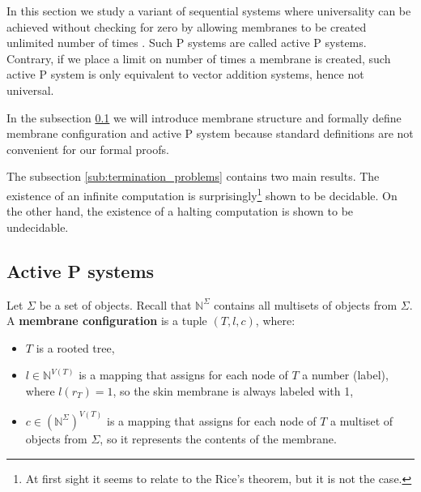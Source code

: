 In this section we study a variant of sequential systems where universality can be achieved without checking for zero by allowing membranes to be created unlimited number of times \cite{Ibarra05Active}. Such P systems are called active P systems. Contrary, if we place a limit on number of times a membrane is created, such active P system is only equivalent to vector addition systems, hence not universal.

In the subsection \ref{sub:active_p_systems} we will introduce membrane structure and formally define membrane configuration and active P system because standard definitions are not convenient for our formal proofs.

The subsection \ref{sub:termination_problems} contains two main results. The existence of an infinite computation is surprisingly\footnote{At first sight it seems to relate to the Rice's theorem, but it is not the case.} shown to be decidable.
On the other hand, the existence of a halting computation is shown to be undecidable.

\subsection{Active P systems} %
\label{sub:active_p_systems}

\begin{definition}
  \label{def:membrane_structure}
  Let $\Sigma$ be a set of objects. Recall that $\mathbb N^\Sigma$ contains all multisets of objects from $\Sigma$. A {\bf membrane configuration} is a tuple $(T, l, c)$, where:
  \begin{itemize}
    \item $T$ is a rooted tree,
    \item $l\in\mathbb N^{V(T)}$ is a mapping that assigns for each node of $T$ a number (label), where $l(r_T)=1$, so the skin membrane is always labeled with 1,
    \item $c\in(\mathbb N^\Sigma)^{V(T)}$ is a mapping that assigns for each node of $T$ a multiset of objects from $\Sigma$, so it represents the contents of the membrane.
  \end{itemize}
\end{definition}

